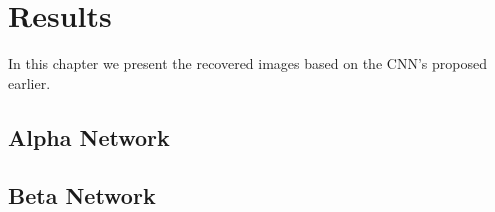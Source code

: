 \chapter{Results}
In this chapter we present the recovered images based on the CNN's proposed earlier.

\section{Alpha Network}

\section{Beta Network}
